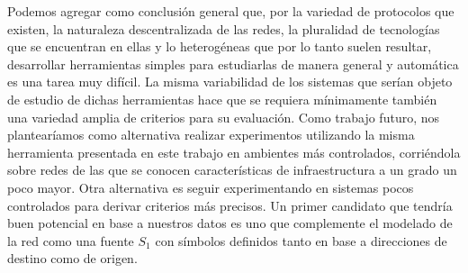 Podemos agregar como conclusión general que, por la variedad de protocolos que existen, la naturaleza descentralizada de las redes, la pluralidad de tecnologías que se encuentran en ellas y lo heterogéneas que por lo tanto suelen resultar, desarrollar herramientas simples para estudiarlas de manera general y automática es una tarea muy difícil. La misma variabilidad de los sistemas que serían objeto de estudio de dichas herramientas hace que se requiera mínimamente también una variedad amplia de criterios para su evaluación. Como trabajo futuro, nos plantearíamos como alternativa realizar experimentos utilizando la misma herramienta presentada en este trabajo en ambientes más controlados, corriéndola sobre redes de las que se conocen características de infraestructura a un grado un poco mayor. Otra alternativa es seguir experimentando en sistemas pocos controlados para derivar criterios más precisos. Un primer candidato que tendría buen potencial en base a nuestros datos es uno que complemente el modelado de la red como una fuente $S_1$ con símbolos definidos tanto en base a direcciones de destino como de origen.
